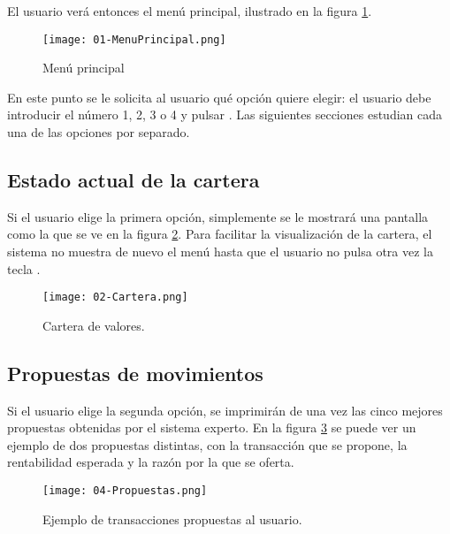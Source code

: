\documentclass[a4paper, 11pt, titlepage]{article}
\begin{document}
    El usuario verá entonces el menú principal, ilustrado en la figura \ref{fig:menu}.

    \begin{center}
        \begin{figure}[!htb]
            \centering
            \texttt{[image: 01-MenuPrincipal.png]}
            \caption{Menú principal}
            \label{fig:menu}
        \end{figure}
    \end{center}

    En este punto se le solicita al usuario qué opción quiere elegir: el usuario debe introducir el número 1, 2, 3 o 4 y pulsar \code{[Entrar]}. Las siguientes secciones estudian cada una de las opciones por separado.

    \subsection{Estado actual de la cartera}

    Si el usuario elige la primera opción, simplemente se le mostrará una pantalla como la que se ve en la figura \ref{fig:cartera}. Para facilitar la visualización de la cartera, el sistema no muestra de nuevo el menú hasta que el usuario no pulsa otra vez la tecla \code{[Entrar]}.

    \begin{center}
        \begin{figure}[!htb]
            \centering
            \texttt{[image: 02-Cartera.png]}
            \caption{Cartera de valores.}
            \label{fig:cartera}
        \end{figure}
    \end{center}


    \subsection{Propuestas de movimientos}

    Si el usuario elige la segunda opción, se imprimirán de una vez las cinco mejores propuestas obtenidas por el sistema experto. En la figura \ref{fig:propuestas} se puede ver un ejemplo de dos propuestas distintas, con la transacción que se propone, la rentabilidad esperada y la razón por la que se oferta.

    \begin{center}
        \begin{figure}[!htb]
            \centering
            \texttt{[image: 04-Propuestas.png]}
            \caption{Ejemplo de transacciones propuestas al usuario.}
            \label{fig:propuestas}
        \end{figure}
    \end{center}
\end{document}
